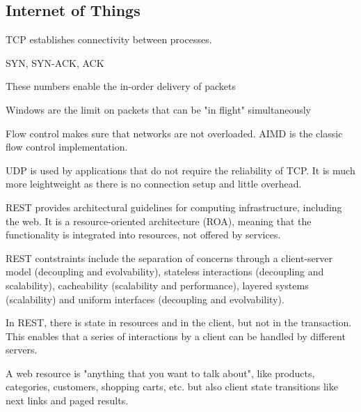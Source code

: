 \subsection{Internet of Things}
\begin{mytitle} TCP establishes connectivity between processes. 
    \begin{mysubtitle} SYN, SYN-ACK, ACK
    \end{mysubtitle}
    \begin{mysubtitle} These numbers enable the in-order delivery of packets
    \end{mysubtitle}
    \begin{mysubtitle}[Window] Windows are the limit on packets that can be "in flight" simultaneously
    \end{mysubtitle}
    \begin{mysubtitle} Flow control makes sure that networks are not overloaded. AIMD is the classic flow control implementation.
    \end{mysubtitle}
\end{mytitle}
\begin{mytitle} UDP is used by applications that do not require the reliability of TCP. It is much more leightweight as there is no connection setup and little overhead.
\end{mytitle}
\begin{mytitle} REST provides architectural guidelines for computing infrastructure, including the web. It is a resource-oriented architecture (ROA), meaning that the functionality is integrated into resources, not offered by services. 
    \begin{mysubtitle}[Constraints] REST contstraints include the separation of concerns through a client-server model (decoupling and evolvability), stateless interactions (decoupling and scalability), cacheability (scalability and performance), layered systems (scalability) and uniform interfaces (decoupling and evolvability).
    \end{mysubtitle}
\end{mytitle}
\begin{myremark} In REST, there is state in resources and in the client, but not in the transaction. This enables that a series of interactions by a client can be handled by different servers.
\end{myremark}
\begin{mytitle} A web resource is "anything that you want to talk about", like products, categories, customers, shopping carts, etc. but also client state transitions like next links and paged results.
\end{mytitle}
